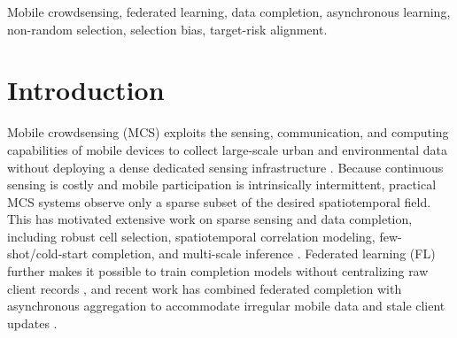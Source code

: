 \documentclass[letterpaper,journal]{IEEEtran}
\begin{document}
\begin{IEEEkeywords}
Mobile crowdsensing, federated learning, data completion, asynchronous learning, non-random selection, selection bias, target-risk alignment.
\end{IEEEkeywords}

%
%

\section{Introduction}
\label{sec:introduction}

Mobile crowdsensing (MCS) exploits the sensing, communication, and computing
capabilities of mobile devices to collect large-scale urban and environmental
data without deploying a dense dedicated sensing infrastructure
\cite{ganti2011mobile,guo2015mobile,ma2014opportunities}.  Because
continuous sensing is costly and mobile participation is intrinsically
intermittent, practical MCS systems observe only a sparse subset of the desired
spatiotemporal field.  This has motivated extensive work on sparse sensing and
data completion, including robust cell selection, spatiotemporal correlation
modeling, few-shot/cold-start completion, and multi-scale inference
\cite{wang2023outlier,li2024robust,wang2023transformer,wang2024fewshot,wang2025evolutionary,xu2025rethinking,liu2026pyramid,zhang2026mapt}.
Federated learning (FL) further makes it possible to train completion models
without centralizing raw client records
\cite{mcmahan2017communication,yang2019federated,kairouz2021advances,li2020federated},
and recent work has combined federated completion with asynchronous aggregation
to accommodate irregular mobile data and stale client updates
\cite{wang2026federated,xie2019asynchronous,liu2023adaptive,sun2024staleness}.
\end{document}
